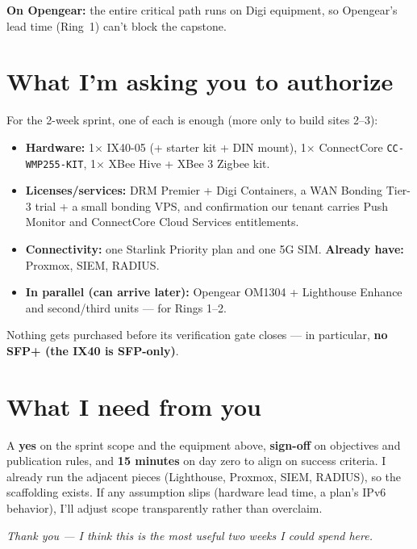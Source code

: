 \documentclass[11pt,letterpaper]{article}
\newcommand{\keyphrase}[1]{\textbf{\textcolor{PrimaryBlue}{#1}}}
\begin{document}
\textbf{On Opengear:} the entire critical path runs on Digi equipment, so Opengear's lead time (Ring~1) can't block the capstone.

\section{What I'm asking you to authorize}

For the 2-week sprint, one of each is enough (more only to build sites 2--3):

\begin{itemize}
  \item \textbf{Hardware:} 1$\times$ IX40-05 (+ starter kit + DIN mount), 1$\times$ ConnectCore \texttt{CC-WMP255-KIT}, 1$\times$ XBee Hive + XBee 3 Zigbee kit.
  \item \textbf{Licenses/services:} DRM Premier + Digi Containers, a WAN Bonding Tier-3 trial + a small bonding VPS, and confirmation our tenant carries Push Monitor and ConnectCore Cloud Services entitlements.
  \item \textbf{Connectivity:} one Starlink Priority plan and one 5G SIM. \quad\textbf{Already have:} Proxmox, SIEM, RADIUS.
  \item \textbf{In parallel (can arrive later):} Opengear OM1304 + Lighthouse Enhance and second/third units --- for Rings 1--2.
\end{itemize}

Nothing gets purchased before its verification gate closes --- in particular, \keyphrase{no SFP+ (the IX40 is SFP-only)}.

\section{What I need from you}

A \textbf{yes} on the sprint scope and the equipment above, \textbf{sign-off} on objectives and publication rules, and \textbf{15 minutes} on day zero to align on success criteria. I already run the adjacent pieces (Lighthouse, Proxmox, SIEM, RADIUS), so the scaffolding exists. If any assumption slips (hardware lead time, a plan's IPv6 behavior), I'll adjust scope transparently rather than overclaim.

\vspace{5pt}
\textit{\color{PrimaryBlue}Thank you --- I think this is the most useful two weeks I could spend here.}
\end{document}
